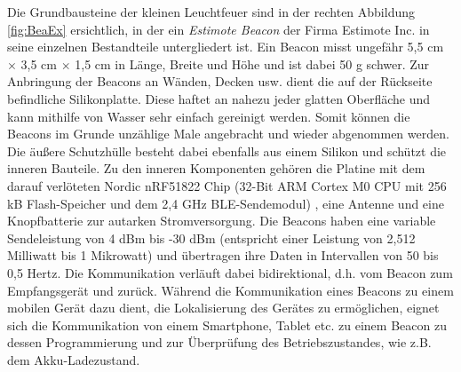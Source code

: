 Die Grundbausteine der kleinen Leuchtfeuer sind in der rechten Abbildung \ref{fig:BeaEx} ersichtlich, in der ein \textit{Estimote Beacon} der Firma Estimote Inc. in seine einzelnen Bestandteile untergliedert ist. Ein Beacon misst ungefähr 5,5 cm $\times$ 3,5 cm $\times$ 1,5 cm in Länge, Breite und Höhe und ist dabei 50 g schwer. Zur Anbringung der Beacons an Wänden, Decken usw. dient die auf der Rückseite befindliche Silikonplatte. Diese haftet an nahezu jeder glatten Oberfläche und kann mithilfe von Wasser sehr einfach gereinigt werden. Somit können die Beacons im Grunde unzählige Male angebracht und wieder abgenommen werden. Die äußere Schutzhülle besteht dabei ebenfalls aus einem Silikon und schützt die inneren Bauteile. Zu den inneren Komponenten gehören die Platine mit dem darauf verlöteten Nordic nRF51822 Chip (32-Bit ARM Cortex M0 CPU mit 256 kB Flash-Speicher und dem 2,4 GHz BLE-Sendemodul) \cite{nRF5}, eine Antenne und eine Knopfbatterie zur autarken Stromversorgung. Die Beacons haben eine variable Sendeleistung von 4 dBm bis -30 dBm (entspricht einer Leistung von 2,512 Milliwatt bis 1 Mikrowatt) und übertragen ihre Daten in Intervallen von 50 bis 0,5 Hertz. Die Kommunikation verläuft dabei bidirektional, d.h. vom Beacon zum Empfangsgerät und zurück. Während die Kommunikation eines Beacons zu einem mobilen Gerät dazu dient, die Lokalisierung des Gerätes zu ermöglichen, eignet sich die Kommunikation von einem Smartphone, Tablet etc. zu einem Beacon zu dessen Programmierung und zur Überprüfung des Betriebszustandes, wie z.B. dem Akku-Ladezustand. \\ \\
